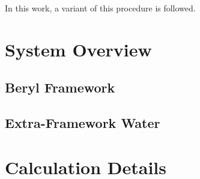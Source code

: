             In this work, a variant of this procedure is followed.

    \section{System Overview}
    
        \subsection{Beryl Framework}
        \subsection{Extra-Framework Water}
        
    \section{Calculation Details}
    